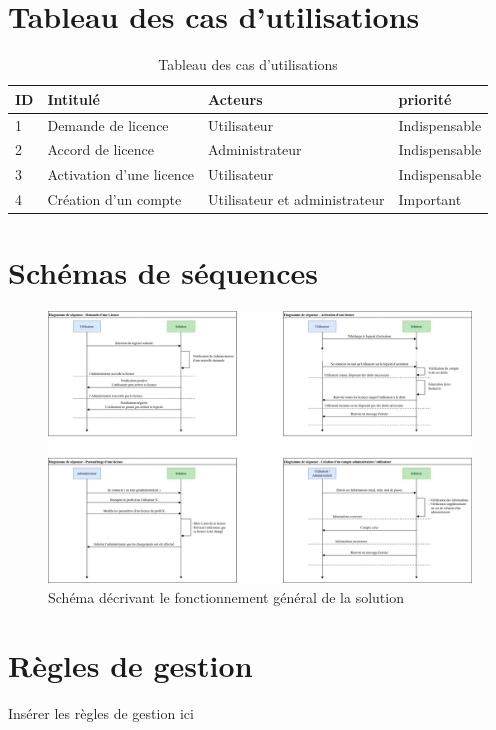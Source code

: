 \section{Tableau des cas d'utilisations}

\begin{table}[h]
	\centering
	\begin{tabular}{ | m{0.6cm} | m{6cm} | m{6cm}| m{3cm} | } 
                \hline
		\textbf{ID} & \textbf{Intitulé} & \textbf{Acteurs} & \textbf{priorité} \\
                \hline
			1 & Demande de licence & Utilisateur & Indispensable \\
                \hline
			2 & Accord de licence & Administrateur & Indispensable \\
                \hline
			3 & Activation d'une licence & Utilisateur & Indispensable \\
		\hline
			4 & Création d'un compte & Utilisateur et administrateur & Important \\
		\hline
        \end{tabular}
	\caption{Tableau des cas d'utilisations}
	\label{tab:tab1}
\end{table}
\newpage

\section{Schémas de séquences}

\begin{figure}[h]
	\centering
	\includegraphics[width=13cm]{main/Seq.png}
	\caption{Schéma décrivant le fonctionnement général de la solution}
	\label{fig:fig3}
\end{figure}

\section{Règles de gestion}

Insérer les règles de gestion ici

